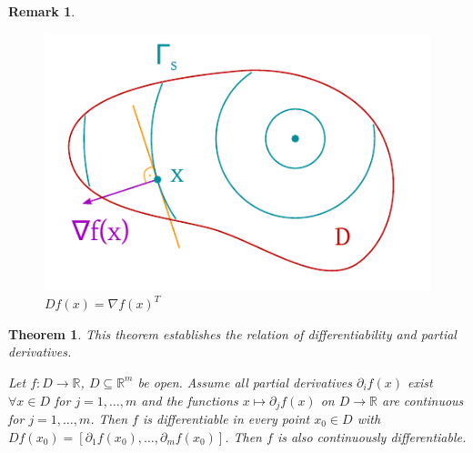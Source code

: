 \documentclass{article}
\newtheorem{theorem}{Theorem}  \numberwithin{theorem}{section}
\newtheorem{remark}{Remark}  \numberwithin{remark}{section}
\begin{document}
\begin{remark}
  \begin{figure}[!h]
    \begin{center}
      \includegraphics{img/33_gradient_2.pdf}
      \caption{$Df(x) = \nabla f(x)^T$}
      \label{img:nab}
    \end{center}
  \end{figure}
\end{remark}

\begin{theorem} %
  \label{thm:rel2}
  This theorem establishes the relation of differentiability and partial derivatives.

  Let $f: D \to \mathbb R$, $D \subseteq \mathbb R^m$ be open.
  Assume all partial derivatives $\partial_i f(x)$ exist $\forall x \in D$ for $j = 1, \dots, m$
  and the functions $x \mapsto \partial_j f(x)$ on $D \to \mathbb R$ are continuous for $j = 1, \dots, m$.
  Then $f$ is differentiable in every point $x_0 \in D$ with $Df(x_0) = [\partial_1 f(x_0), \dots, \partial_m f(x_0)]$.
  Then $f$ is also continuously differentiable.
\end{theorem}
\end{document}
